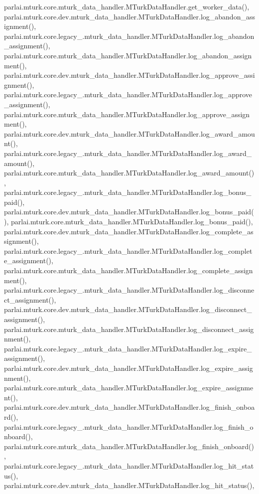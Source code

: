 parlai.\+mturk.\+core.\+mturk\+\_\+data\+\_\+handler.\+M\+Turk\+Data\+Handler.\+get\+\_\+worker\+\_\+data(), parlai.\+mturk.\+core.\+dev.\+mturk\+\_\+data\+\_\+handler.\+M\+Turk\+Data\+Handler.\+log\+\_\+abandon\+\_\+assignment(), parlai.\+mturk.\+core.\+legacy\+\_.\+mturk\+\_\+data\+\_\+handler.\+M\+Turk\+Data\+Handler.\+log\+\_\+abandon\+\_\+assignment(), parlai.\+mturk.\+core.\+mturk\+\_\+data\+\_\+handler.\+M\+Turk\+Data\+Handler.\+log\+\_\+abandon\+\_\+assignment(), parlai.\+mturk.\+core.\+dev.\+mturk\+\_\+data\+\_\+handler.\+M\+Turk\+Data\+Handler.\+log\+\_\+approve\+\_\+assignment(), parlai.\+mturk.\+core.\+legacy\+\_.\+mturk\+\_\+data\+\_\+handler.\+M\+Turk\+Data\+Handler.\+log\+\_\+approve\+\_\+assignment(), parlai.\+mturk.\+core.\+mturk\+\_\+data\+\_\+handler.\+M\+Turk\+Data\+Handler.\+log\+\_\+approve\+\_\+assignment(), parlai.\+mturk.\+core.\+dev.\+mturk\+\_\+data\+\_\+handler.\+M\+Turk\+Data\+Handler.\+log\+\_\+award\+\_\+amount(), parlai.\+mturk.\+core.\+legacy\+\_.\+mturk\+\_\+data\+\_\+handler.\+M\+Turk\+Data\+Handler.\+log\+\_\+award\+\_\+amount(), parlai.\+mturk.\+core.\+mturk\+\_\+data\+\_\+handler.\+M\+Turk\+Data\+Handler.\+log\+\_\+award\+\_\+amount(), parlai.\+mturk.\+core.\+legacy\+\_.\+mturk\+\_\+data\+\_\+handler.\+M\+Turk\+Data\+Handler.\+log\+\_\+bonus\+\_\+paid(), parlai.\+mturk.\+core.\+dev.\+mturk\+\_\+data\+\_\+handler.\+M\+Turk\+Data\+Handler.\+log\+\_\+bonus\+\_\+paid(), parlai.\+mturk.\+core.\+mturk\+\_\+data\+\_\+handler.\+M\+Turk\+Data\+Handler.\+log\+\_\+bonus\+\_\+paid(), parlai.\+mturk.\+core.\+dev.\+mturk\+\_\+data\+\_\+handler.\+M\+Turk\+Data\+Handler.\+log\+\_\+complete\+\_\+assignment(), parlai.\+mturk.\+core.\+legacy\+\_.\+mturk\+\_\+data\+\_\+handler.\+M\+Turk\+Data\+Handler.\+log\+\_\+complete\+\_\+assignment(), parlai.\+mturk.\+core.\+mturk\+\_\+data\+\_\+handler.\+M\+Turk\+Data\+Handler.\+log\+\_\+complete\+\_\+assignment(), parlai.\+mturk.\+core.\+legacy\+\_.\+mturk\+\_\+data\+\_\+handler.\+M\+Turk\+Data\+Handler.\+log\+\_\+disconnect\+\_\+assignment(), parlai.\+mturk.\+core.\+dev.\+mturk\+\_\+data\+\_\+handler.\+M\+Turk\+Data\+Handler.\+log\+\_\+disconnect\+\_\+assignment(), parlai.\+mturk.\+core.\+mturk\+\_\+data\+\_\+handler.\+M\+Turk\+Data\+Handler.\+log\+\_\+disconnect\+\_\+assignment(), parlai.\+mturk.\+core.\+legacy\+\_.\+mturk\+\_\+data\+\_\+handler.\+M\+Turk\+Data\+Handler.\+log\+\_\+expire\+\_\+assignment(), parlai.\+mturk.\+core.\+dev.\+mturk\+\_\+data\+\_\+handler.\+M\+Turk\+Data\+Handler.\+log\+\_\+expire\+\_\+assignment(), parlai.\+mturk.\+core.\+mturk\+\_\+data\+\_\+handler.\+M\+Turk\+Data\+Handler.\+log\+\_\+expire\+\_\+assignment(), parlai.\+mturk.\+core.\+dev.\+mturk\+\_\+data\+\_\+handler.\+M\+Turk\+Data\+Handler.\+log\+\_\+finish\+\_\+onboard(), parlai.\+mturk.\+core.\+legacy\+\_.\+mturk\+\_\+data\+\_\+handler.\+M\+Turk\+Data\+Handler.\+log\+\_\+finish\+\_\+onboard(), parlai.\+mturk.\+core.\+mturk\+\_\+data\+\_\+handler.\+M\+Turk\+Data\+Handler.\+log\+\_\+finish\+\_\+onboard(), parlai.\+mturk.\+core.\+legacy\+\_.\+mturk\+\_\+data\+\_\+handler.\+M\+Turk\+Data\+Handler.\+log\+\_\+hit\+\_\+status(), parlai.\+mturk.\+core.\+dev.\+mturk\+\_\+data\+\_\+handler.\+M\+Turk\+Data\+Handler.\+log\+\_\+hit\+\_\+status(), 